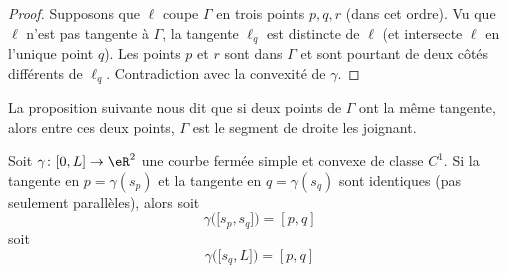 \begin{proof}
	Supposons que \( \ell\) coupe \( \Gamma\) en trois points \( p,q,r\) (dans cet ordre). Vu que \( \ell\) n'est pas tangente à \( \Gamma\), la tangente \( \ell_q\) est distincte de \( \ell\) (et intersecte \( \ell\) en l'unique point \( q\)). Les points \( p\) et \( r\) sont dans \( \Gamma\) et sont pourtant de deux côtés différents de \( \ell_q\). Contradiction avec la convexité de \( \gamma\).
\end{proof}

La proposition suivante nous dit que si deux points de \( \Gamma\) ont la même tangente, alors entre ces deux points, \( \Gamma\) est le segment de droite les joignant.
\begin{proposition}     \label{PROPooCKTZooIPcUca}
	Soit \( \gamma\colon \mathopen[ 0 , L \mathclose]\to \eR^2\) une courbe fermée simple et convexe de classe \( C^1\). Si la tangente en \( p=\gamma(s_p)\) et la tangente en \( q=\gamma(s_q)\) sont identiques (pas seulement parallèles), alors soit
	\begin{equation}
		\gamma\big( \mathopen[ s_p , s_q \mathclose] \big)=[p,q]
	\end{equation}
	soit
	\begin{equation}
		\gamma\big( \mathopen[ s_q , L \mathclose] \big)=[p,q]
	\end{equation}
\end{proposition}

